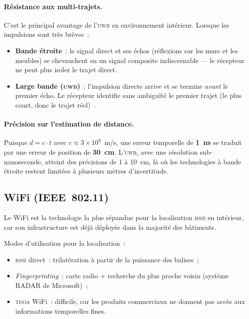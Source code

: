 \documentclass[12pt, a4paper]{article}
\newcommand{\TDOA}{\textsc{tdoa}}
\newcommand{\RSSI}{\textsc{rssi}}
\newcommand{\UWB}{\textsc{uwb}}
\begin{document}
\paragraph{Résistance aux multi-trajets.}
C'est le principal avantage de l'\UWB{} en environnement intérieur. Lorsque les
impulsions sont très brèves~:
\begin{itemize}
  \item \textbf{Bande étroite}~: le signal direct et ses échos (réflexions sur
        les murs et les meubles) se chevauchent en un signal composite
        indiscernable — le récepteur ne peut plus isoler le trajet direct.
  \item \textbf{Large bande (\UWB{})}~: l'impulsion directe arrive et se termine
        \emph{avant} le premier écho. Le récepteur identifie sans ambiguïté le
        premier trajet (le plus court, donc le trajet réel)~\cite{Kossonou2014}.
\end{itemize}

\paragraph{Précision sur l'estimation de distance.}
Puisque $d = c \cdot t$ avec $c \approx 3 \times 10^8$~m/s, une erreur temporelle
de \textbf{1~ns} se traduit par une erreur de position de \textbf{30~cm}.
L'\UWB{}, avec une résolution sub-nanoseconde, atteint des précisions de 1 à 10~cm,
là où les technologies à bande étroite restent limitées à plusieurs mètres
d'incertitude.

\subsection{WiFi (IEEE~802.11)}

Le WiFi est la technologie la plus répandue pour la localisation \RSSI{} en
intérieur, car son infrastructure est déjà déployée dans la majorité des bâtiments.

Modes d'utilisation pour la localisation~:
\begin{itemize}
  \item \RSSI{} direct~: trilatération à partir de la puissance des balises~;
  \item \textit{Fingerprinting}~: carte radio + recherche du plus proche voisin
        (système RADAR de Microsoft)~;
  \item \TDOA{} WiFi~: difficile, car les produits commerciaux ne donnent pas
        accès aux informations temporelles fines.
\end{itemize}
\end{document}
